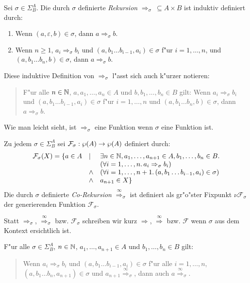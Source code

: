 \documentclass[12pt,a4paper]{article}
\begin{document}
\begin{definition}[Rekursion]
  Sei $\sigma \in \Sigma^A_B$. Die durch $\sigma$ definierte \emph{Rekursion}
  $\Rightarrow_\sigma\ \subseteq A \times B$ ist induktiv definiert durch:
  \begin{enumerate}
  \item Wenn $(a,\varepsilon, b) \in \sigma$, dann $a \Rightarrow_\sigma b$.
  \item Wenn $n \ge 1$, $a_i \Rightarrow_\sigma b_i$ und $(a,b_1 \ldots b_{i-1},a_i) \in \sigma$ f"ur $i=1,\ldots,n$,
    und $(a,b_1 \ldots b_n,b)\in\sigma$, dann $a \Rightarrow_\sigma b$.
  \end{enumerate}
\end{definition}
Diese induktive Definition von $\Rightarrow_\sigma$ l"asst sich auch k"urzer notieren:
\begin{quote}
  F"ur alle $n \in \mathbb N$, $a, a_1,\ldots,a_n \in A$ und $b,b_1,\ldots,b_n\in B$ gilt: 
  Wenn $a_i \Rightarrow_\sigma b_i$ und $(a,b_1 \ldots b_{i-1},a_i)\in\sigma$ f"ur $i = 1,\ldots,n$ und
  $(a,b_1 \ldots b_n,b)\in\sigma$, dann $a \Rightarrow_\sigma b$.
\end{quote}
Wie man leicht sieht, ist $\Rightarrow_\sigma$ eine Funktion wenn $\sigma$ eine Funktion ist.

\begin{definition}[Co-Rekursion]
  Zu jedem $\sigma \in \Sigma^A_B$ sei $\mathcal{F}_\sigma:\wp(A) \to \wp(A)$ definiert durch:
  \[\begin{array}{rll}
    \mathcal{F}_\sigma(X) = \{a \in A & \mid & \exists n\in\mathbb N,a_1,\ldots,a_{n+1}\in A,b_1,\ldots,b_n\in B.\\
    && (\forall i=1,\ldots,n.\,a_i \Rightarrow_\sigma b_i) \\
    &\wedge& (\forall i=1,\ldots,n+1.\,(a,b_1 \ldots b_{i-1},a_i) \in \sigma) \\
    &\wedge& a_{n+1} \in X\}
  \end{array}\]
  Die durch $\sigma$ definierte \emph{Co-Rekursion} $\stackrel{\infty}{\Rightarrow}_\sigma$ ist definiert
  als gr"o"ster Fixpunkt $\nu\mathcal{F}_\sigma$ der generierenden Funktion $\mathcal{F}_\sigma$.
\end{definition}
Statt $\Rightarrow_\sigma$, $\stackrel{\infty}{\Rightarrow}_\sigma$ bzw. $\mathcal{F}_\sigma$
schreiben wir kurz $\Rightarrow$, $\stackrel{\infty}{\Rightarrow}$ bzw. $\mathcal{F}$ wenn
$\sigma$ aus dem Kontext ersichtlich ist.

\begin{lemma}
  F"ur alle $\sigma\in\Sigma^A_B$, $n\in\mathbb N$, $a_1,\ldots,a_{n+1}\in A$ und $b_1,\ldots,b_n \in B$ gilt:
  \begin{quote}
    Wenn $a_i \Rightarrow_\sigma b_i$ und $(a,b_1 \ldots b_{i-1},a_i)\in\sigma$ f"ur alle $i=1,\ldots,n$,
    $(a,b_1 \ldots b_n,a_{n+1})\in\sigma$ und $a_{n+1} \stackrel{\infty}{\Rightarrow}_\sigma$, dann
    auch $a \stackrel{\infty}{\Rightarrow}_\sigma$.
  \end{quote}
\end{lemma}
\end{document}
